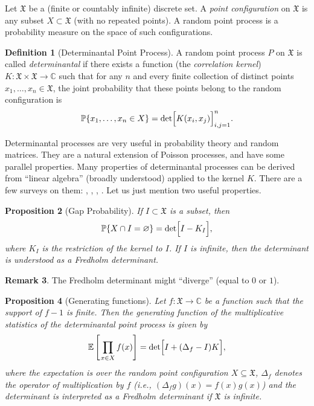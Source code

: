 \documentclass[letterpaper,11pt,oneside,reqno]{article}
\numberwithin{equation}{section}
\newcommand{\ssp}{\hspace{1pt}}
\newtheorem{proposition}{Proposition}[section]
\theoremstyle{definition}
\newtheorem{definition}[proposition]{Definition}
\newtheorem{remark}[proposition]{Remark}
\begin{document}
Let $\mathfrak{X}$ be a (finite or countably infinite)
discrete set. A \emph{point configuration} on $\mathfrak{X}$
is any subset $X\subset\mathfrak{X}$ (with no repeated
points). A random point process is a probability measure on
the space of such configurations.

\begin{definition}[Determinantal Point Process]
A random point process $P$ on $\mathfrak{X}$ is called
\emph{determinantal} if there exists a function (the
\emph{correlation kernel})
$K:\mathfrak{X}\times\mathfrak{X}\to\mathbb{C}$ such that
for any $n$ and every finite collection of distinct points
$x_1,\dots,x_n\in \mathfrak{X}$, the joint probability that
these points belong to the random configuration is
\[
\operatorname{\mathbb{P}}\{x_1,\dots,x_n\in X\}=\det\Bigl[K(x_i,x_j)\Bigr]_{i,j=1}^n.
\]
\end{definition}

Determinantal processes are very useful in probability theory and random matrices.
They are a natural extension of Poisson processes, and have some parallel properties.
Many properties of determinantal processes can be derived from ``linear algebra'' (broadly
understood) applied to the kernel $K$.
There are a few surveys on them:
\cite{Soshnikov2000}, \cite{peres2006determinantal},
\cite{Borodin2009},
\cite{kulesza2012determinantal}.
Let us just mention two useful properties.

\begin{proposition}[Gap Probability]
	If $I\subset\mathfrak{X}$ is a subset, then
	\[
	\operatorname{\mathbb{P}}\{X\cap I=\varnothing\}=\det\Bigl[I-K_I\Bigr],
	\]
	where $K_I$ is the restriction of the kernel to $I$.
	If $I$ is infinite, then the determinant is understood as a
	Fredholm determinant.
\end{proposition}
\begin{remark}
	The Fredholm determinant
	might ``diverge'' (equal to $0$ or $1$).
\end{remark}

\begin{proposition}[Generating functions]
	\label{prop:gen-func}
	Let $f:\mathfrak{X}\to\mathbb{C}$ be a function such that the support of $f-1$ is finite. Then the generating function of the multiplicative statistics of the determinantal point process is given by
	\[
	\mathbb{E}\left[\ssp\prod_{x\in X} f(x)\right]
	=\det\Bigl[I + (\Delta_f - I)K\Bigr],
	\]
	where the expectation is over the random point configuration $X\subseteq\mathfrak{X}$,
	$\Delta_f$ denotes the operator of multiplication by $f$ (i.e., $(\Delta_f g)(x)=f(x)g(x)$)
	and the determinant is interpreted as a Fredholm determinant if $\mathfrak{X}$ is infinite.
\end{proposition}
\end{document}
